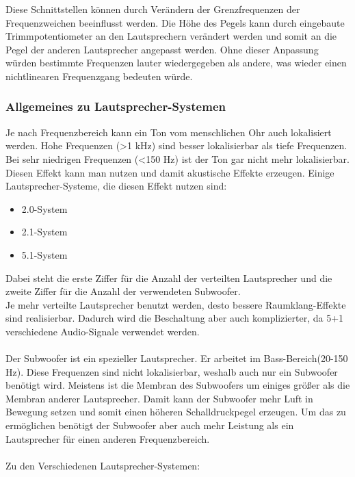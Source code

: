 Diese Schnittstellen können durch Verändern der Grenzfrequenzen der Frequenzweichen beeinflusst werden.
Die Höhe des Pegels kann durch eingebaute Trimmpotentiometer an den Lautsprechern verändert werden und somit an die Pegel der anderen Lautsprecher angepasst werden.
Ohne dieser Anpassung würden bestimmte Frequenzen lauter wiedergegeben als andere, was wieder einen nichtlinearen Frequenzgang bedeuten würde.

\newpage
\subsubsection*{Allgemeines zu Lautsprecher-Systemen}
Je nach Frequenzbereich kann ein Ton vom menschlichen Ohr auch lokalisiert \mbox{werden}.
Hohe Frequenzen (>1 kHz) sind besser lokalisierbar als tiefe Frequenzen.
Bei sehr niedrigen Frequenzen (<150 Hz) ist der Ton gar nicht mehr lokalisierbar.
Diesen \mbox{Effekt} kann man nutzen und damit akustische Effekte erzeugen.
Einige Lautsprecher-Systeme, die diesen Effekt nutzen sind:
\begin{itemize}
	\item 2.0-System
	\item 2.1-System
	\item 5.1-System
\end{itemize}
Dabei steht die erste Ziffer für die Anzahl der verteilten Lautsprecher und die zweite Ziffer für die Anzahl der verwendeten Subwoofer.
\\
Je mehr verteilte Lautsprecher benutzt werden, desto bessere Raumklang-Effekte sind realisierbar.
Dadurch wird die Beschaltung aber auch komplizierter, da 5+1 verschiedene Audio-Signale verwendet werden.
\\ \\
Der Subwoofer ist ein spezieller Lautsprecher.
Er arbeitet im Bass-Bereich(20-150 Hz).
Diese Frequenzen sind nicht lokalisierbar, weshalb auch nur ein Subwoofer benötigt wird.
Meistens ist die Membran des Subwoofers um einiges größer als die Membran anderer Lautsprecher.
Damit kann der Subwoofer mehr Luft in Bewegung setzen und somit einen höheren Schalldruckpegel erzeugen.
Um das zu ermöglichen benötigt der Subwoofer aber auch mehr Leistung als ein Lautsprecher für einen anderen Frequenzbereich.
\\ \\

\newpage
Zu den Verschiedenen Lautsprecher-Systemen:
